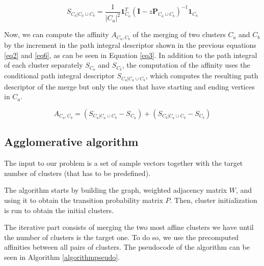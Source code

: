 \documentclass[
	10pt,
	parskip=half-,	
	paper=a4,
	english
	]{scrartcl}
\begin{document}
\begin{equation}
    S_{C_a|C_a\cup C_b} = \frac{1}{|C_a|^2} \boldsymbol{1}_{C_a}^{T}(\boldsymbol{I}-z\boldsymbol{P}_{C_a\cup C_b})^{-1}\boldsymbol{1}_{C_a}
    \label{eq6}
\end{equation}

Now, we can compute the affinity \(A_{C_a,C_b}\) of the merging of two clusters \(C_a\) and \(C_b\) by the increment in the path integral descriptor shown in the previous equations \ref{eq2} and \ref{eq6}, as can be seen in Equation \ref{eq3}. In addition to the path integral of each cluster separately \(S_{C_a}\) and \(S_{C_b}\), the computation of the affinity uses the conditional path integral descriptor \(S_{C_a|C_a\cup C_b}\), which computes the resulting path descriptor of the merge but only the ones that have starting and ending vertices in \(C_a\).

\begin{equation}
    A_{C_a,C_b} = (S_{C_a|C_a\cup C_b}-S_{C_a}) + (S_{C_b|C_a\cup C_b}-S_{C_b})
    \label{eq3}
\end{equation}

\subsection{Agglomerative algorithm}

The input to our problem is a set of sample vectors together with the target number of clusters (that has to be predefined).

The algorithm starts by building the graph, weighted adjacency matrix \(W\), and using it to obtain the transition probability matrix \(P\). Then, cluster initialization is run to obtain the initial clusters.

The iterative part consists of merging the two most affine clusters we have until the number of clusters is the target one. To do so, we use the precomputed affinities between all pairs of clusters. The pseudocode of the algorithm can be seen in Algorithm \ref{algorithmpseudo}.
\end{document}
